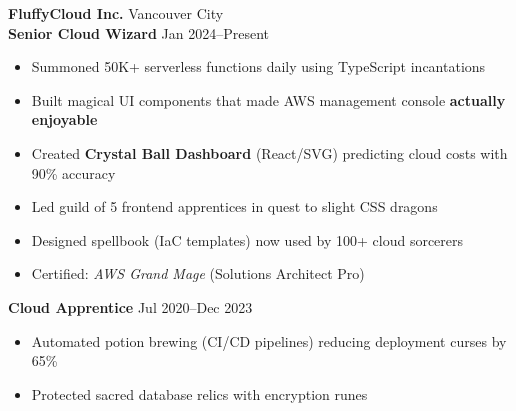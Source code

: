 \textbf{FluffyCloud Inc.} \hfill Vancouver City \\
\textbf{Senior Cloud Wizard} \hfill Jan 2024--Present
\begin{itemize}
  \item Summoned 50K+ serverless functions daily using TypeScript incantations
  \item Built magical UI components that made AWS management console \textbf{actually enjoyable}
  \iffrontend
    \item Created \textbf{Crystal Ball Dashboard} (React/SVG) predicting cloud costs with 90\% accuracy
    \item Led guild of 5 frontend apprentices in quest to slight CSS dragons
  \else
    \item Designed spellbook (IaC templates) now used by 100+ cloud sorcerers
  \fi
  \item Certified: \textit{AWS Grand Mage} (Solutions Architect Pro)
\end{itemize}

\textbf{Cloud Apprentice} \hfill Jul 2020--Dec 2023
\begin{itemize}
  \item Automated potion brewing (CI/CD pipelines) reducing deployment curses by 65\%
  \item Protected sacred database relics with encryption runes
\end{itemize}